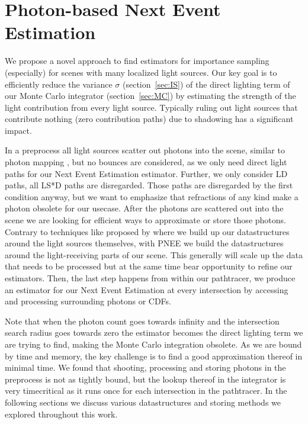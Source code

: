 
\chapter{Photon-based Next Event Estimation}
\label{ch:PNEE}

We propose a novel approach to find estimators for importance sampling (especially) for scenes with many localized light sources. Our key goal is to efficiently reduce the variance $\sigma$ (section~\ref{sec:IS})  of the direct lighting term of our Monte Carlo integrator (section~\ref{sec:MC}) by estimating the strength of the light contribution from every light source. Typically ruling out light sources that contribute nothing (zero contribution paths) due to shadowing has a significant impact.

In a preprocess all light sources scatter out photons into the scene, similar to photon mapping \cite{jensen2001realistic}, but no bounces are considered, as we only need direct light paths for our Next Event Estimation estimator. Further, we only consider LD paths, all LS*D paths are disregarded. Those paths are disregarded by the first condition anyway, but we want to emphasize that refractions of any kind make a photon obsolete for our usecase. After the photons are scattered out into the scene we are looking for efficient ways to approximate or store those photons. Contrary to techniques like proposed by \cite{Estevez} where we build up our datastructures around the light sources themselves, with PNEE we build the datastructures around the light-receiving parts of our scene. This generally will scale up the data that needs to be processed but at the same time bear opportunity to refine our estimators. Then, the last step happens from within our pathtracer, we produce an estimator for our Next Event Estimation at every intersection by accessing and processing surrounding photons or CDFs.

Note that when the photon count goes towards infinity and the intersection search radius goes towards zero the estimator becomes the direct lighting term we are trying to find, making the Monte Carlo integration obsolete. As we are bound by time and memory, the key challenge is to find a good approximation thereof in minimal time. We found that shooting, processing and storing photons in the preprocess is not as tightly bound, but the lookup thereof in the integrator is very timecritical as it runs once for each intersection in the pathtracer. In the following sections we discuss various datastructures and storing methods we explored throughout this work.



